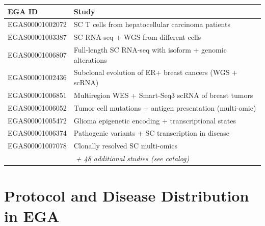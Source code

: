 \documentclass[11pt,letterpaper]{article}
\begin{document}
{\small
\begin{longtable}{@{} l p{9cm} @{}}
\toprule
\textbf{EGA ID} & \textbf{Study} \\
\midrule
\endhead
EGAS00001002072 & SC T cells from hepatocellular carcinoma patients \\
EGAS00001003387 & SC RNA-seq + WGS from different cells \\
EGAS00001006807 & Full-length SC RNA-seq with isoform + genomic alterations \\
EGAS00001002436 & Subclonal evolution of ER+ breast cancers (WGS + scRNA) \\
EGAS00001006851 & Multiregion WES + Smart-Seq3 scRNA of breast tumors \\
EGAS00001006052 & Tumor cell mutations + antigen presentation (multi-omic) \\
EGAS00001005472 & Glioma epigenetic encoding + transcriptional states \\
EGAS00001006374 & Pathogenic variants + SC transcription in disease \\
EGAS00001007078 & Clonally resolved SC multi-omics \\
\multicolumn{2}{c}{\textit{+ 48 additional studies (see catalog)}} \\
\bottomrule
\end{longtable}
}

\section{Protocol and Disease Distribution in EGA}
\end{document}
